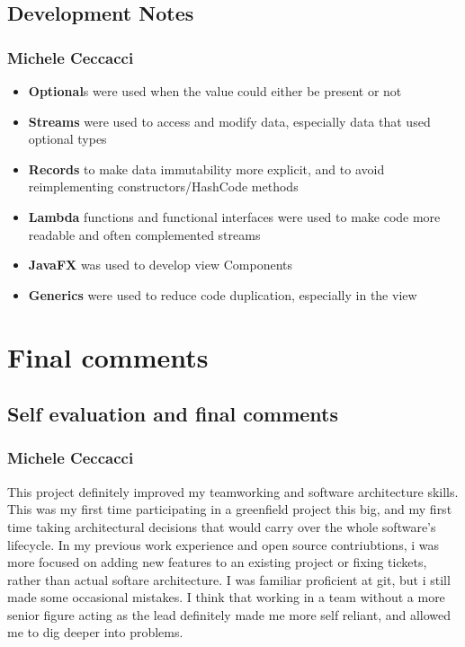 \documentclass[a4paper,12pt]{report}
\begin{document}


\section{Development Notes}

\subsection{Michele Ceccacci}
\begin{itemize}
	\item \textbf{Optional}s were used when the value could either be present or not
	\item \textbf{Streams} were used to access and modify data, especially data that used optional types
	\item \textbf{Records} to make data immutability more explicit, and to avoid reimplementing constructors/HashCode methods
	\item \textbf{Lambda} functions and functional interfaces were used to make code more readable and often complemented streams 
	\item \textbf{JavaFX} was used to develop view Components
	\item \textbf{Generics} were used to reduce code duplication, especially in the view
\end{itemize}



\chapter{Final comments}

\section{Self evaluation and final comments}

\subsection{Michele Ceccacci}
This project definitely improved my teamworking and software architecture skills. 
This was my first time participating in a greenfield project this big, and my first time 
taking architectural decisions that would carry over the whole software's lifecycle. 
In my previous work experience and open source contriubtions, i was more focused on  adding new features 
to an existing project or fixing tickets, rather than actual softare architecture. 
I was familiar proficient at git, but i still made some occasional mistakes.
I think that working in a team without a more senior figure acting as the  lead definitely 
made me more  self reliant, and allowed me to dig deeper into problems.
\end{document}
